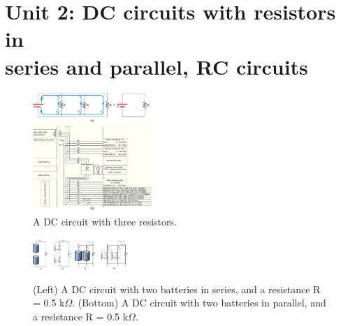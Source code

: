 \documentclass[12pt,twocolumn]{article}
\begin{document}
\section{Unit 2: DC circuits with resistors in \\ series and parallel, RC circuits}

\begin{figure}
\centering
\includegraphics[width=0.4\textwidth,trim=0cm 13.5cm 5.5cm 0cm,clip=true]{parallel.jpeg}
\caption{\label{fig:para} A DC circuit with three resistors.}
\end{figure}
\begin{figure}
\centering
\includegraphics[width=0.13\textwidth,trim=0cm 0.5cm 4cm 0cm,clip=true]{series_batt.jpg}
\includegraphics[width=0.18\textwidth,trim=0cm 0.5cm 5.5cm 0.41cm,clip=true]{parallel_batt.jpg}
\caption{\label{fig:batt} (Left) A DC circuit with two batteries in series, and a resistance R = 0.5 k$\Omega$. (Bottom) A DC circuit with two batteries in parallel, and a resistance R = 0.5 k$\Omega$.}
\end{figure}
\end{document}
